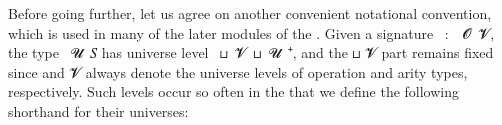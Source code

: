 \ccpad
\begin{comment}
However, for the sake of completeness, here is how one could define a type representing the product of algebras inhabiting the record type \AgdaRecord{algebra}.
\ccpad
\begin{code}%
\>[0][@{}l@{\AgdaIndent{0}}]%
\>[1]\AgdaFunction{⨅'}\AgdaSpace{}%
\AgdaSymbol{:}\AgdaSpace{}%
\AgdaSymbol{(}\AgdaBound{𝒜}\AgdaSpace{}%
\AgdaSymbol{:}\AgdaSpace{}%
\AgdaBound{I}\AgdaSpace{}%
\AgdaSymbol{→}\AgdaSpace{}%
\AgdaRecord{algebra}\AgdaSpace{}%
\AgdaBound{𝓤}\AgdaSpace{}%
\AgdaBound{𝑆}\AgdaSymbol{)}\AgdaSpace{}%
\AgdaSymbol{→}\AgdaSpace{}%
\AgdaRecord{algebra}\AgdaSpace{}%
\AgdaSymbol{(}\AgdaBound{𝓘}\AgdaSpace{}%
\AgdaOperator{\AgdaPrimitive{⊔}}\AgdaSpace{}%
\AgdaBound{𝓤}\AgdaSymbol{)}\AgdaSpace{}%
\AgdaBound{𝑆}\<%
\\
\>[1]\AgdaFunction{⨅'}\AgdaSpace{}%
\AgdaBound{𝒜}\AgdaSpace{}%
\AgdaSymbol{=}\AgdaSpace{}%
\AgdaKeyword{record}%
\>[100I]\AgdaSymbol{\{}\AgdaSpace{}%
\AgdaField{univ}\AgdaSpace{}%
\AgdaSymbol{=}\AgdaSpace{}%
\AgdaSymbol{∀}\AgdaSpace{}%
\AgdaBound{i}\AgdaSpace{}%
\AgdaSymbol{→}\AgdaSpace{}%
\AgdaField{univ}\AgdaSpace{}%
\AgdaSymbol{(}\AgdaBound{𝒜}\AgdaSpace{}%
\AgdaBound{i}\AgdaSymbol{)}\AgdaSpace{}\AgdaSymbol{;}%
\>[55]\AgdaComment{-- domain}\<%
\\
\>[100I][@{}l@{\AgdaIndent{0}}]%
\>[15]\AgdaField{op}\AgdaSpace{}%
\AgdaSymbol{=}\AgdaSpace{}%
\AgdaSymbol{λ}\AgdaSpace{}%
\AgdaBound{𝑓}\AgdaSpace{}%
\AgdaBound{𝑎}\AgdaSpace{}%
\AgdaBound{i}\AgdaSpace{}%
\AgdaSymbol{→}\AgdaSpace{}%
\AgdaSymbol{(}\AgdaField{op}\AgdaSpace{}%
\AgdaSymbol{(}\AgdaBound{𝒜}\AgdaSpace{}%
\AgdaBound{i}\AgdaSymbol{))}\AgdaSpace{}%
\AgdaBound{𝑓}\AgdaSpace{}%
\AgdaSymbol{λ}\AgdaSpace{}%
\AgdaBound{x}\AgdaSpace{}%
\AgdaSymbol{→}\AgdaSpace{}%
\AgdaBound{𝑎}\AgdaSpace{}%
\AgdaBound{x}\AgdaSpace{}%
\AgdaBound{i}\AgdaSpace{}\AgdaSymbol{\}}%
\>[55]\AgdaComment{-- basic operations}\<%
\end{code}
\ccpad
\end{comment}
Before going further, let us agree on another convenient notational convention, which is used in many of the later modules of the \ualib. Given a signature ~\as :~~\ab 𝓞~\ab 𝓥, the type ~\ab 𝓤~\ab 𝑆 has universe level ~\ap ⊔~\ab 𝓥~\ap ⊔~\ab 𝓤~\af ⁺, and the  \ap ⊔ \ab 𝓥 part remains fixed since  and \ab 𝓥 always denote the universe levels of operation and arity types, respectively. Such levels occur so often in the \ualib that we define the following shorthand for their universes: \AgdaSpace{}%
